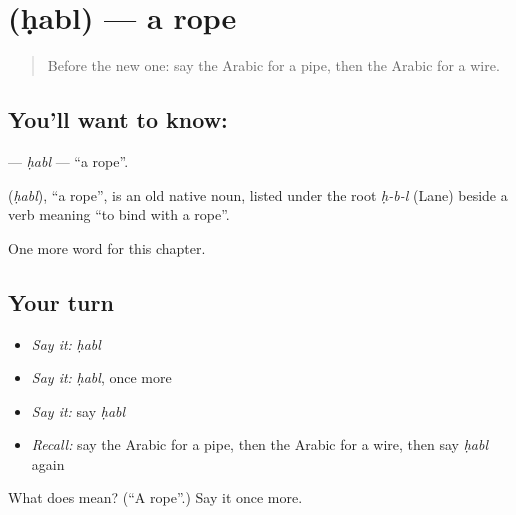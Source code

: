 \section[\texorpdfstring{\ar{حبل} (ḥabl)}{حبل (ḥabl)}]{ (ḥabl) — a rope}

\label{lesson:AR-C187-habl}



\begin{quote}
Before the new one: say the Arabic for a pipe, then the Arabic for a wire.
\end{quote}

\subsection*{You'll want to know: }
\textbf{} — \emph{ḥabl} — \textquotedblleft{}a rope\textquotedblright{}.

\begin{cousinweb}
\textbf{} (\emph{ḥabl}), \textquotedblleft{}a rope\textquotedblright{}, is an old native noun, listed under the root \emph{ḥ-b-l} (Lane) beside a verb meaning \textquotedblleft{}to bind with a rope\textquotedblright{}.
\end{cousinweb}

\begin{grammarlens}[title={What you've built}]
One more word for this chapter.
\end{grammarlens}

\subsection*{Your turn}
\begin{itemize}
\raggedright
  \item \emph{Say it:} \emph{ḥabl}
  \item \emph{Say it:} \emph{ḥabl}, once more
  \item \emph{Say it:} say \emph{ḥabl}
  \item \emph{Recall:} say the Arabic for a pipe, then the Arabic for a wire, then say \emph{ḥabl} again
\end{itemize}

\begin{tcolorbox}[breakable,colback=teal!4,colframe=teal!35!black,title={Before you move on}]
What does  mean? (\textquotedblleft{}A rope\textquotedblright{}.) Say it once more.
\end{tcolorbox}
